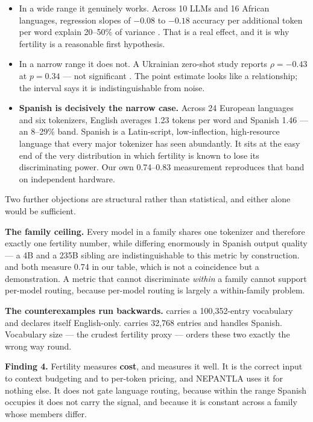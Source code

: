 \begin{itemize}
  \item In a wide range it genuinely works. Across 10 LLMs and 16 African
        languages, regression slopes of $-0.08$ to $-0.18$ accuracy per
        additional token per word explain 20--50\% of variance
        \citep{anon2025fertilityafrican}. That is a real effect, and it is why
        fertility is a reasonable first hypothesis.
  \item In a narrow range it does not. A Ukrainian zero-shot study reports
        $\rho = -0.43$ at \textbf{$p = 0.34$} --- not significant
        \citep{anon2026ukrainianfertility}. The point estimate looks like a
        relationship; the interval says it is indistinguishable from noise.
  \item \textbf{Spanish is decisively the narrow case.} Across 24 European
        languages and six tokenizers, English averages 1.23 tokens per word and
        Spanish 1.46 \citep{anon2026europeantokenizers} --- an 8--29\% band.
        Spanish is a Latin-script, low-inflection, high-resource language that
        every major tokenizer has seen abundantly. It sits at the easy end of the
        very distribution in which fertility is known to lose its discriminating
        power. Our own 0.74--0.83 measurement reproduces that band on independent
        hardware.
\end{itemize}

Two further objections are structural rather than statistical, and either alone
would be sufficient.

\textbf{The family ceiling.} Every model in a family shares one tokenizer and
therefore exactly one fertility number, while differing enormously in Spanish
output quality --- a 4B and a 235B sibling are indistinguishable to this metric
by construction.  and  both measure 0.74 in
our table, which is not a coincidence but a demonstration. A metric that cannot
discriminate \emph{within} a family cannot support per-model routing, because
per-model routing is largely a within-family problem.

\textbf{The counterexamples run backwards.}  carries a
100{,}352-entry vocabulary and declares itself English-only.
 carries 32{,}768 entries and handles Spanish. Vocabulary
size --- the crudest fertility proxy --- orders these two exactly the wrong way
round.

\begin{keyinsight}
\textbf{Finding 4.} Fertility measures \textbf{cost}, and measures it well. It is
the correct input to context budgeting and to per-token pricing, and NEPANTLA
uses it for nothing else. It does not gate language routing, because within the
range Spanish occupies it does not carry the signal, and because it is constant
across a family whose members differ.
\end{keyinsight}

